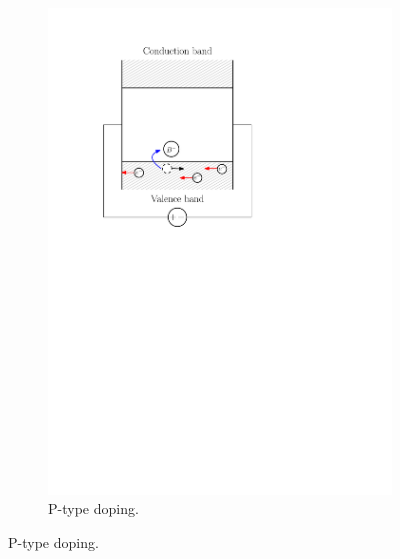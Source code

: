 \documentclass[letterpaper]{article}
\theoremstyle{remark}
\begin{document}
\begin{figure}[H]
\begin{subfigure}{.5\textwidth}
\includegraphics[scale=0.5]{p_type_doping.pdf}
\caption{P-type doping.}
\end{subfigure}
\end{figure}
\end{document}
